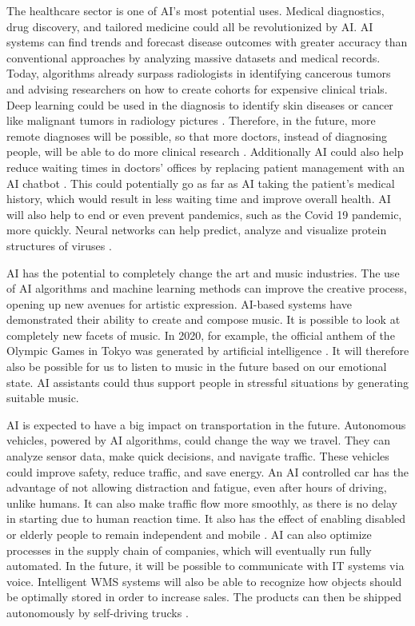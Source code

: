 \documentclass{article}
\begin{document}
The healthcare sector is one of AI's most potential uses. Medical diagnostics, drug discovery, and tailored medicine could all be revolutionized by AI. AI systems can find trends and forecast disease outcomes with greater accuracy than conventional approaches by analyzing massive datasets and medical records. Today, algorithms already surpass radiologists in identifying cancerous tumors and advising researchers on how to create cohorts for expensive clinical trials. Deep learning could be used in the diagnosis to identify skin diseases or cancer like malignant tumors in radiology pictures \cite{5}. Therefore, in the future, more remote diagnoses will be possible, so that more doctors, instead of diagnosing people, will be able to do more clinical research \cite{7}. Additionally AI could also help reduce waiting times in doctors' offices by replacing patient management with an AI chatbot \cite{8}. This could potentially go as far as AI taking the patient's medical history, which would result in less waiting time and improve overall health. AI will also help to end or even prevent pandemics, such as the Covid 19 pandemic, more quickly. Neural networks can help predict, analyze and visualize protein structures of viruses \cite{6}. \par 

AI has the potential to completely change the art and music industries. The use of AI algorithms and machine learning methods can improve the creative process, opening up new avenues for artistic expression. AI-based systems have demonstrated their ability to create and compose music. It is possible to look at completely new facets of music. In 2020, for example, the official anthem of the Olympic Games in Tokyo was generated by artificial intelligence \cite{11}. It will therefore also be possible for us to listen to music in the future based on our emotional state. AI assistants could thus support people in stressful situations by generating suitable music. \par

AI is expected to have a big impact on transportation in the future. Autonomous vehicles, powered by AI algorithms, could change the way we travel. They can analyze sensor data, make quick decisions, and navigate traffic. These vehicles could improve safety, reduce traffic, and save energy. An AI controlled car has the advantage of not allowing distraction and fatigue, even after hours of driving, unlike humans. It can also make traffic flow more smoothly, as there is no delay in starting due to human reaction time. It also has the effect of enabling disabled or elderly people to remain independent and mobile \cite{9}.
AI can also optimize processes in the supply chain of companies, which will eventually run fully automated. In the future, it will be possible to communicate with IT systems via voice. Intelligent WMS systems will also be able to recognize how objects should be optimally stored in order to increase sales. The products can then be shipped autonomously by self-driving trucks \cite{10}. \par \ \par
\end{document}
